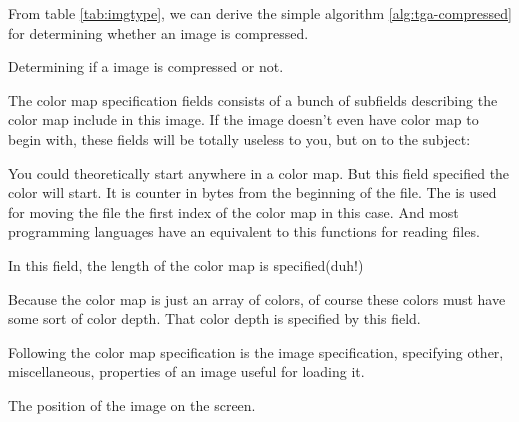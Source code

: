 \begin{refsection}
  From table \ref{tab:imgtype}, we can derive the simple algorithm
  \ref{alg:tga-compressed} for determining whether an image is
  compressed.

  \begin{algorithm}[H]
    \caption{Determining if a \tga image is compressed or not.}
    \label{alg:tga-compressed}
    \begin{algorithmic}[1]
    \end{algorithmic}
  \end{algorithm}


  The color map specification fields consists of a bunch of subfields
  describing the color map include in this image. If the image doesn't
  even have color map to begin with, these fields will be totally
  useless to you, but on to the subject:


  You could theoretically start anywhere in a color map. But this
  field specified the color will start. It is counter in bytes from
  the beginning of the file. The  is used for moving
  the file the first index of the color map in this case. And most
  programming languages have an equivalent to this functions for
  reading files.


  In this field, the length of the color map is specified(duh!)


  Because the color map is just an array of colors, of course these
  colors must have some sort of color depth. That color depth is
  specified by this field.


  Following the color map specification is the image specification,
  specifying other, miscellaneous, properties of an image useful for
  loading it.



  The position of the image on the screen.


\end{refsection}
